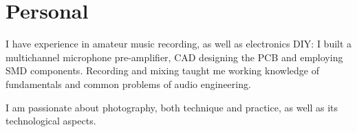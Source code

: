 \section{Personal}
I have experience in amateur music recording, as well as electronics DIY: I built a multichannel microphone pre-amplifier, CAD designing the PCB and employing SMD components. Recording and mixing taught me working knowledge of fundamentals and common problems of audio engineering.


I am passionate about photography, both technique and practice, as well as its technological aspects. 
